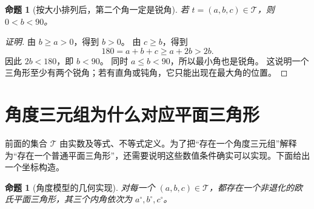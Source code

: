 \documentclass[UTF8,a4paper,zihao=-4,oneside,openany,fontset=fandol]{ctexbook}
\newtheorem{proposition}[theorem]{命题}
\theoremstyle{definition}
\theoremstyle{remark}
\begin{document}
\begin{proposition}[按大小排列后，第二个角一定是锐角]
若 $t=(a,b,c)\in\mathcal T$，则 $0<b<90$。
\end{proposition}

\begin{proof}[证明]
由 $b\ge a>0$，得到 $b>0$。
由 $c\ge b$，得到
\[
180=a+b+c\ge a+2b>2b.
\]
因此 $2b<180$，即 $b<90$。
同时 $a\le b<90$，所以最小角也是锐角。
这说明一个三角形至少有两个锐角；若有直角或钝角，它只能出现在最大角的位置。
\end{proof}

\section{角度三元组为什么对应平面三角形}
\label{math:geometry-bridge}

前面的集合 $\mathcal T$ 由实数及等式、不等式定义。为了把“存在一个角度三元组”解释为“存在一个普通平面三角形”，还需要说明这些数值条件确实可以实现。下面给出一个坐标构造。

\begin{proposition}[角度模型的几何实现]
对每一个 $(a,b,c)\in\mathcal T$，都存在一个非退化的欧氏平面三角形，其三个内角依次为 $a^\circ,b^\circ,c^\circ$。
\end{proposition}
\end{document}
